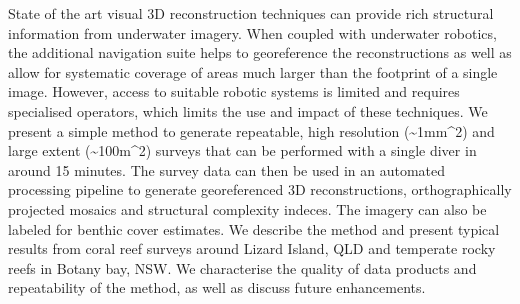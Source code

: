 
State of the art visual 3D reconstruction techniques can provide rich structural information from underwater imagery. When coupled with underwater robotics, the additional navigation suite helps to georeference the reconstructions as well as allow for systematic coverage of areas much larger than the footprint of a single image. However, access to suitable robotic systems is limited and requires specialised operators, which limits the use and impact of these techniques.
We present a simple method to generate repeatable, high resolution (\sim{1mm^{2}}) and large extent (\sim{100m^{2}}) surveys that can be performed with a single diver in around 15 minutes. The survey data can then be used in an automated processing pipeline to generate georeferenced 3D reconstructions, orthographically projected mosaics and structural complexity indeces. The imagery can also be labeled for benthic cover estimates.
We describe the method and present typical results from coral reef surveys around Lizard Island, QLD and temperate rocky reefs in Botany bay, NSW. We characterise the quality of data products and repeatability of the method, as well as discuss future enhancements.